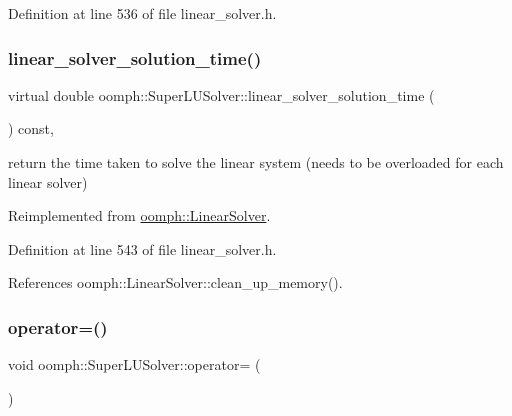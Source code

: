 Definition at line 536 of file linear\+\_\+solver.\+h.

\mbox{\label{classoomph_1_1SuperLUSolver_a39e375e5ca81863127fe6d381ef97b65}} 
\subsubsection{\texorpdfstring{linear\+\_\+solver\+\_\+solution\+\_\+time()}{linear\_solver\_solution\_time()}}
{\footnotesize\ttfamily virtual double oomph\+::\+Super\+L\+U\+Solver\+::linear\+\_\+solver\+\_\+solution\+\_\+time (\begin{DoxyParamCaption}{ }\end{DoxyParamCaption}) const\hspace{0.3cm}{\ttfamily [inline]}, {\ttfamily [virtual]}}



return the time taken to solve the linear system (needs to be overloaded for each linear solver) 



Reimplemented from \hyperlink{classoomph_1_1LinearSolver_a3c66f77db812a9c196478c7e2f77ef09}{oomph\+::\+Linear\+Solver}.



Definition at line 543 of file linear\+\_\+solver.\+h.



References oomph\+::\+Linear\+Solver\+::clean\+\_\+up\+\_\+memory().

\mbox{\label{classoomph_1_1SuperLUSolver_adab7beeef8f9eec635b9f07ca423e2bb}} 
\subsubsection{\texorpdfstring{operator=()}{operator=()}}
{\footnotesize\ttfamily void oomph\+::\+Super\+L\+U\+Solver\+::operator= (\begin{DoxyParamCaption}\item[{const \hyperlink{classoomph_1_1SuperLUSolver}{Super\+L\+U\+Solver} \&}]{ }\end{DoxyParamCaption})\hspace{0.3cm}{\ttfamily [inline]}}



